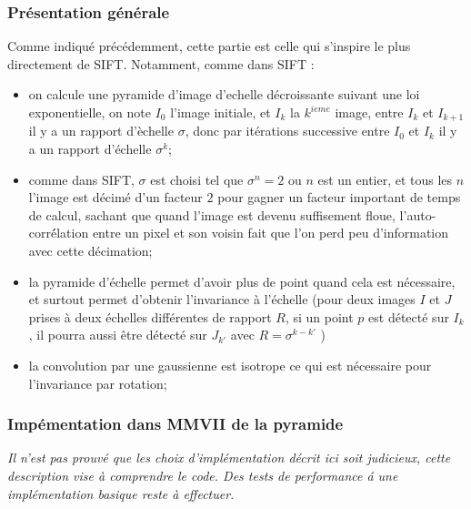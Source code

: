 \subsubsection{Pr\'esentation g\'en\'erale}

Comme indiqu\'e pr\'ec\'edemment, cette partie est celle qui s'inspire le plus directement de SIFT.
Notamment, comme dans SIFT :

\begin{itemize}
    \item on calcule une pyramide d'image d'echelle d\'ecroissante suivant une loi exponentielle, 
          on note $I_0$ l'image initiale, et $I_k$ la $k^{ieme}$ image, entre $I_k$ et $I_{k+1}$
          il y a un rapport d'\`echelle $\sigma$, donc par it\'erations successive entre $I_0$
          et $I_k$ il y a un rapport d'\'echelle $\sigma^k$;

    \item comme dans SIFT, $\sigma$ est choisi tel que $\sigma^n=2$ ou $n$ est un entier, et
          tous les $n$ l'image est d\'ecim\'e d'un facteur $2$ pour gagner un facteur important de temps
          de calcul, sachant que quand l'image est devenu suffisement floue, l'auto-corr\'élation entre un
          pixel et son voisin fait que l'on perd peu d'information avec cette d\'ecimation;

    \item  la pyramide d'\'echelle permet d'avoir plus de point quand cela est n\'ecessaire, et surtout
           permet d'obtenir l'invariance \`a l'\'echelle (pour deux images $I$ et $J$ prises \`a deux
           \'echelles diff\'erentes de rapport $R$, si un point $p$ est d\'etect\'e sur $I_k$, il pourra aussi
           \^etre d\'etect\'e sur $J_{k'}$ avec $R = \sigma^{k-k'}$ )

    \item  la convolution par une gaussienne est isotrope ce qui  est n\'ecessaire pour l'invariance par rotation;


\end{itemize}


\subsubsection{Imp\'ementation dans MMVII de la pyramide}

\emph{Il n'est pas prouv\'e que les choix d'impl\'ementation d\'ecrit ici soit judicieux, cette description
vise à comprendre le code. Des tests de performance \'a une impl\'ementation basique reste \`a effectuer.}

